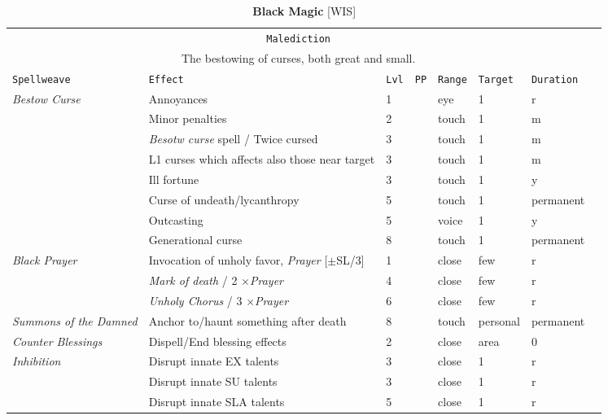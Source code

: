 \documentclass[10pt,a4paper]{article}
\begin{document}
\begin{table}[htbp!]
\caption*{\textbf{\Large{Black Magic}} [WIS]}
\begin{tabular}{llllllll}
   \multicolumn{7}{c}{\texttt{Malediction}}\\
   \multicolumn{7}{c}{The bestowing of curses, both great and small.}\\
    \hline
    \texttt{Spellweave} & \texttt{Effect} & \texttt{Lvl} & \texttt{PP} & \texttt{Range} & \texttt{Target} & \texttt{Duration} \\
    \hline
    \multirow{1}{*}{\textit{Bestow Curse}} &  Annoyances & 1 && eye & 1 & r \\
    										&  Minor penalties & 2 && touch & 1 & m \\
    										&  \textit{Besotw curse} spell / Twice cursed & 3 && touch & 1 & m \\
    										&  L1 curses which affects also those near target & 3 && touch & 1 & m \\
    										&  Ill fortune & 3 && touch & 1 & y \\
    										&  Curse of undeath/lycanthropy & 5 && touch & 1 & permanent \\
    										&  Outcasting & 5 && voice & 1 & y \\
    										&  Generational curse & 8 && touch & 1 & permanent \\
 
 
 \hline
    \multirow{1}{*}{\textit{Black Prayer}} & Invocation of unholy favor, \textit{Prayer} [$\pm$SL/3] & 1 && close & few & r \\
   									& \textit{Mark of death} / 2 $\times$\textit{Prayer} & 4 && close & few & r \\
   								    & \textit{Unholy Chorus} / 3 $\times$\textit{Prayer}  & 6 && close & few & r \\
    \hline				    
   	\multirow{1}{*}{\textit{Summons of the Damned}} & Anchor to/haunt something after death & 8 && touch & personal & permanent \\	
   	 \hline	    
   	 \multirow{1}{*}{\textit{Counter Blessings}} & Dispell/End blessing effects & 2 && close & area & 0 \\	
   	 \hline	    
   	 \multirow{1}{*}{\textit{Inhibition}} & Disrupt innate EX talents & 3 && close & 1 & r \\	
									   	 & Disrupt innate SU talents & 3 && close & 1 & r \\	
									   	 & Disrupt innate SLA talents & 5 && close & 1 & r \\	
									   	 

\end{tabular}
\end{table}
\end{document}
